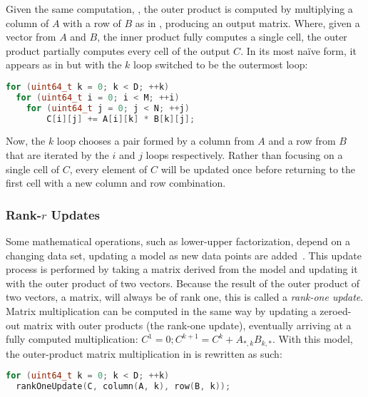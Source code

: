\documentclass[\main/thesis.tex]{subfiles}
\begin{document}
Given the same computation, , the outer product is computed by multiplying a column of $A$ with a row of $B$ as in , producing an output matrix.
Where, given a vector from $A$ and $B$, the inner product fully computes a single cell, the outer product partially computes every cell of the output $C$.
In its most na\"ive form, it appears as in  but with the $k$ loop switched to be the outermost loop:
\begin{lstlisting}[caption={[Basic outer product]A basic matrix multiplication via outer product.},label=lst:basicOuter,language=C++,columns=flexible,morekeywords=uint64_t]
for (uint64_t k = 0; k < D; ++k)
  for (uint64_t i = 0; i < M; ++i)
    for (uint64_t j = 0; j < N; ++j)
        C[i][j] += A[i][k] * B[k][j];
\end{lstlisting}
Now, the $k$ loop chooses a pair formed by a column from $A$ and a row from $B$ that are iterated by the $i$ and $j$ loops respectively.
Rather than focusing on a single cell of $C$, every element of $C$ will be updated once before returning to the first cell with a new column and row combination.

\subsubsection{Rank-\texorpdfstring{$r$}{r} Updates}
Some mathematical operations, such as lower-upper factorization, depend on a changing data set, updating a model as new data points are added~\autocite{strange2007efficient}.
This update process is performed by taking a matrix derived from the model and updating it with the outer product of two vectors.
Because the result of the outer product of two vectors, a matrix, will always be of rank one\footnotemark, this is called a \emph{rank-one update}.
Matrix multiplication can be computed in the same way by updating a zeroed-out matrix with outer products (the rank-one update), eventually arriving at a fully computed multiplication: $C^1=0; C^{k+1}=C^k+A_{*,k}B_{k,*}$.
With this model, the outer-product matrix multiplication in  is rewritten as such:
\begin{lstlisting}[caption={[Matrix multiplication via rank-one update]Matrix multiplication using rank-one update.},label=lst:rankOne,language=C++,columns=flexible,morekeywords=uint64_t]
for (uint64_t k = 0; k < D; ++k)
  rankOneUpdate(C, column(A, k), row(B, k));
\end{lstlisting}
\end{document}
